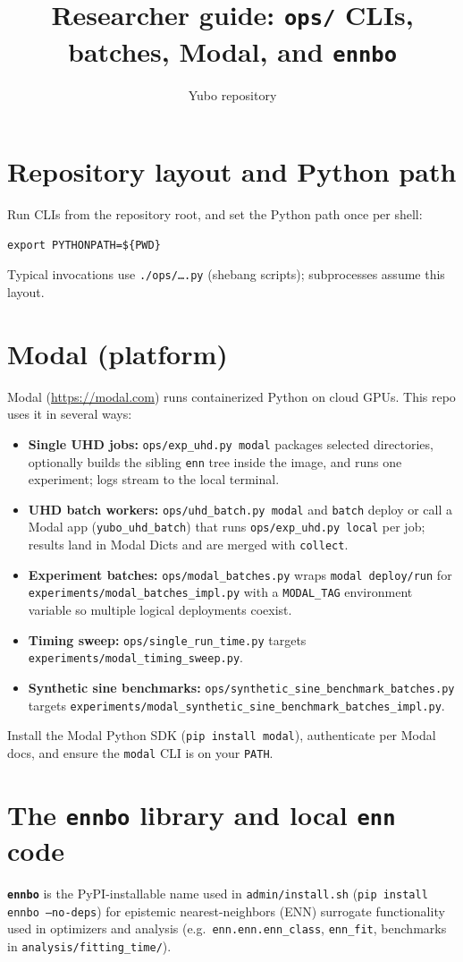 \documentclass[11pt]{article}
\title{Researcher guide: \texttt{ops/} CLIs, batches, Modal, and \texttt{ennbo}}
\author{Yubo repository}
\date{}
\begin{document}
\maketitle

\section{Repository layout and Python path}
Run CLIs from the repository root, and set the Python path once per shell:
\begin{verbatim}
export PYTHONPATH=${PWD}
\end{verbatim}
Typical invocations use \texttt{./ops/\dots.py} (shebang scripts); subprocesses assume this layout.

\section{Modal (platform)}
Modal (\url{https://modal.com}) runs containerized Python on cloud GPUs. This repo uses it in several ways:
\begin{itemize}
  \item \textbf{Single UHD jobs:} \texttt{ops/exp\_uhd.py modal} packages selected directories, optionally builds the sibling \texttt{enn} tree inside the image, and runs one experiment; logs stream to the local terminal.
  \item \textbf{UHD batch workers:} \texttt{ops/uhd\_batch.py modal} and \texttt{batch} deploy or call a Modal app (\texttt{yubo\_uhd\_batch}) that runs \texttt{ops/exp\_uhd.py local} per job; results land in Modal Dicts and are merged with \texttt{collect}.
  \item \textbf{Experiment batches:} \texttt{ops/modal\_batches.py} wraps \texttt{modal deploy/run} for \texttt{experiments/modal\_batches\_impl.py} with a \texttt{MODAL\_TAG} environment variable so multiple logical deployments coexist.
  \item \textbf{Timing sweep:} \texttt{ops/single\_run\_time.py} targets \texttt{experiments/modal\_timing\_sweep.py}.
  \item \textbf{Synthetic sine benchmarks:} \texttt{ops/synthetic\_sine\_benchmark\_batches.py} targets \texttt{experiments/modal\_synthetic\_sine\_benchmark\_batches\_impl.py}.
\end{itemize}
Install the Modal Python SDK (\texttt{pip install modal}), authenticate per Modal docs, and ensure the \texttt{modal} CLI is on your \texttt{PATH}.

\section{The \texttt{ennbo} library and local \texttt{enn} code}
\textbf{\texttt{ennbo}} is the PyPI-installable name used in \texttt{admin/install.sh} (\texttt{pip install ennbo --no-deps}) for epistemic nearest-neighbors (ENN) surrogate functionality used in optimizers and analysis (e.g.\ \texttt{enn.enn.enn\_class}, \texttt{enn\_fit}, benchmarks in \texttt{analysis/fitting\_time/}).
\end{document}
